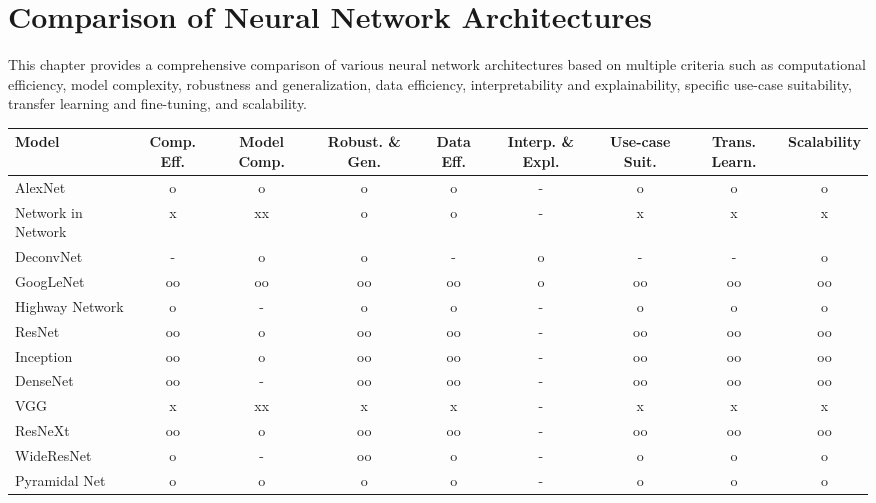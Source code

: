 \chapter{Comparison of Neural Network Architectures}

This chapter provides a comprehensive comparison of various neural network architectures based on multiple criteria such as computational efficiency, model complexity, robustness and generalization, data efficiency, interpretability and explainability, specific use-case suitability, transfer learning and fine-tuning, and scalability.

\begin{landscape}
\begin{table}[ht]
    \centering
    \scriptsize
\begin{tabular}{|l|c|c|c|c|c|c|c|c|}
\hline
\textbf{Model} & \textbf{Comp.} \newline \textbf{Eff.} & \textbf{Model} \newline \textbf{Comp.} & \textbf{Robust. \&} \newline \textbf{Gen.} & \textbf{Data} \newline \textbf{Eff.} & \textbf{Interp. \&} \newline \textbf{Expl.} & \textbf{Use-case} \newline \textbf{Suit.} & \textbf{Trans.} \newline \textbf{Learn.} & \textbf{Scalability} \\ \hline
AlexNet & o & o & o & o & - & o & o & o \\ \hline
Network in Network & x & xx & o & o & - & x & x & x \\ \hline
DeconvNet & - & o & o & - & o & - & - & o \\ \hline
GoogLeNet & oo & oo & oo & oo & o & oo & oo & oo \\ \hline
Highway Network & o & - & o & o & - & o & o & o \\ \hline
ResNet & oo & o & oo & oo & - & oo & oo & oo \\ \hline
Inception & oo & o & oo & oo & - & oo & oo & oo \\ \hline
DenseNet & oo & - & oo & oo & - & oo & oo & oo \\ \hline
VGG & x & xx & x & x & - & x & x & x \\ \hline
ResNeXt & oo & o & oo & oo & - & oo & oo & oo \\ \hline
WideResNet & o & - & oo & o & - & o & o & o \\ \hline
Pyramidal Net & o & o & o & o & - & o & o & o \\ \hline

\end{tabular}
\end{table}
\end{landscape}
